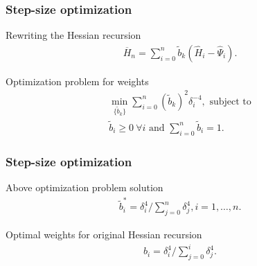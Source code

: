 \begin{frame}
\begin{small}
\frametitle{\centering Step-size optimization}
\begin{block}{\alert{Rewriting the Hessian recursion}}
\begin{align}
\label{eq:hess}
\overline H_n = \sum\limits_{i=0}^{n} \tilde b_k(\widehat H_i -\widehat \Psi_i).
\end{align}
\end{block}
\pause
\begin{block}{\alert{Optimization problem for weights}}
\begin{align}
\min_{ \{\tilde b_k\} } \sum \limits_{i=0}^{n} (\tilde b_k)^2 \delta_i^{-4}, \text{ subject to} \label{eq:wn-opt}\\
\tilde b_i \geq 0 ~\forall i \text{ and }\sum \limits_{i=0}^{n} \tilde b_i = 1.
\end{align}
\end{block}
\end{small}
\end{frame}

\begin{frame}
\begin{small}
\frametitle{\centering Step-size optimization}
\begin{block}{\alert{Above optimization problem solution}}
\begin{align}
\tilde b_i^* = \delta_i^{4}/\sum \limits_{j=0}^{n} \delta_j^{4}, i=1,\ldots,n.
\end{align}
\end{block}
\pause
\begin{block}{\alert{Optimal weights for original Hessian recursion}}
\begin{align}
\label{eq:wieghts}
b_i  = \delta_i^{4}/\sum\limits_{j=0}^{i} \delta_j^{4}.
\end{align}
\end{block}
\end{small}
\end{frame}

